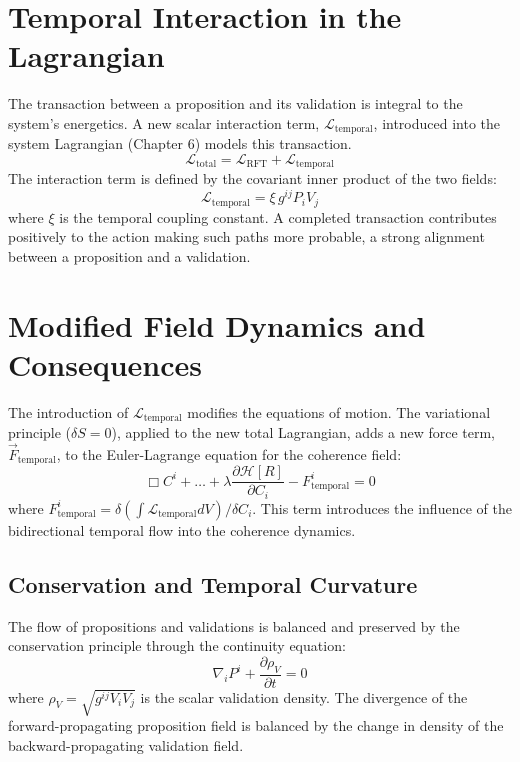 \section{Temporal Interaction in the Lagrangian}

The transaction between a proposition and its validation is integral to the system's energetics. A new scalar interaction term, \(\mathcal{L}_{\text{temporal}}\), introduced into the system Lagrangian (Chapter 6) models this transaction.
\begin{equation}
\mathcal{L}_{\text{total}} = \mathcal{L}_{\text{RFT}} + \mathcal{L}_{\text{temporal}}
\end{equation}
The interaction term is defined by the covariant inner product of the two fields:
\begin{equation}
\mathcal{L}_{\text{temporal}} = \xi \, g^{ij} P_{i} V_{j}
\end{equation}
where \(\xi\) is the temporal coupling constant. A completed transaction contributes positively to the action making such paths more probable, a strong alignment between a proposition and a validation.

\section{Modified Field Dynamics and Consequences}

The introduction of \(\mathcal{L}_{\text{temporal}}\) modifies the equations of motion. The variational principle (\(\delta S = 0\)), applied to the new total Lagrangian, adds a new force term, \(\vec{F}_{\text{temporal}}\), to the Euler-Lagrange equation for the coherence field:
\begin{equation}
\Box C^i + \dots + \lambda \frac{\partial \mathcal{H}[R]}{\partial C_i} - F^i_{\text{temporal}} = 0
\end{equation}
where \(F^i_{\text{temporal}} = \delta(\int \mathcal{L}_{\text{temporal}} dV) / \delta C_i\). This term introduces the influence of the bidirectional temporal flow into the coherence dynamics.

\subsection{Conservation and Temporal Curvature}

The flow of propositions and validations is balanced and preserved by the conservation principle through the continuity equation:
\begin{equation}
\nabla_i P^i + \frac{\partial \rho_V}{\partial t} = 0
\end{equation}
where \(\rho_V = \sqrt{g^{ij} V_{i} V_{j}}\) is the scalar validation density. The divergence of the forward-propagating proposition field is balanced by the change in density of the backward-propagating validation field.

